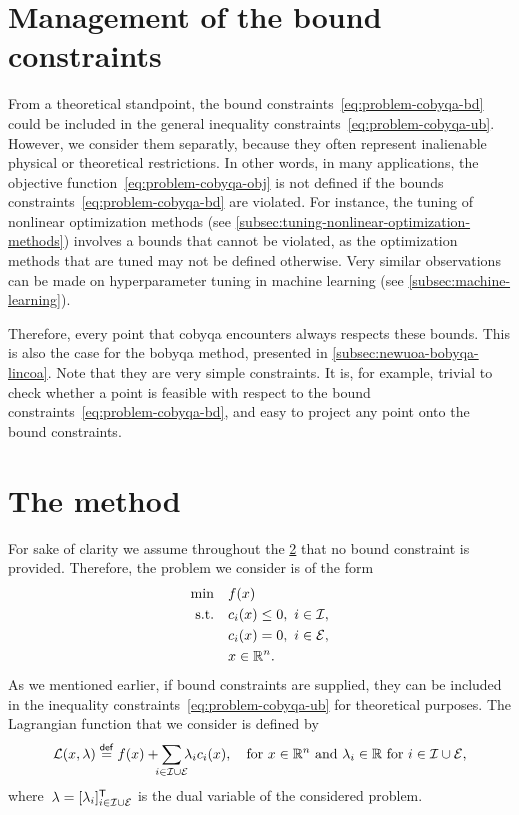 \section{Management of the bound constraints}

From a theoretical standpoint, the bound constraints~\cref{eq:problem-cobyqa-bd} could be included in the general inequality constraints~\cref{eq:problem-cobyqa-ub}.
However, we consider them separatly, because they often represent inalienable physical or theoretical restrictions.
In other words, in many applications, the objective function~\cref{eq:problem-cobyqa-obj} is not defined if the bounds constraints~\cref{eq:problem-cobyqa-bd} are violated.
For instance, the tuning of nonlinear optimization methods (see \cref{subsec:tuning-nonlinear-optimization-methods}) involves a bounds that cannot be violated, as the optimization methods that are tuned may not be defined otherwise.
Very similar observations can be made on hyperparameter tuning in machine learning (see \cref{subsec:machine-learning}).

Therefore, every point that \gls{cobyqa} encounters always respects these bounds.
This is also the case for the \gls{bobyqa} method, presented in \cref{subsec:newuoa-bobyqa-lincoa}.
Note that they are very simple constraints.
It is, for example, trivial to check whether a point is feasible with respect to the bound constraints~\cref{eq:problem-cobyqa-bd}, and easy to project any point onto the bound constraints.


\section{The  method}
\label{sec:sqp-method}

For sake of clarity we assume throughout the \cref{sec:sqp-method} that no bound constraint is provided.
Therefore, the problem we consider is of the form
\begin{subequations}
    \label{eq:problem-cobyqa-no-bounds}
    \begin{align}
        \min        & \quad f(x)\\
        \text{s.t.} & \quad c_{i}(x) \le 0, ~ i \in \mathcal{I},\\
                    & \quad c_{i}(x) = 0, ~ i \in \mathcal{E},\\
                    & \quad x \in \mathbb{R}^n. \nonumber
    \end{align}
\end{subequations}
As we mentioned earlier, if bound constraints are supplied, they can be included in the inequality constraints~\cref{eq:problem-cobyqa-ub} for theoretical purposes.
The Lagrangian function that we consider is defined by
\begin{equation*}
    \lag(x, \lambda) \eqdef \obj(x) + \sum_{\mathclap{i \in \iub \cup \ieq}} \lambda_i \con{i}(x), \quad \text{for~$x \in \R^n$ and~$\lambda_i \in \R$ for~$i \in \iub \cup \ieq$},
\end{equation*}
where~$\lambda = [\lambda_i]_{i \in \mathcal{I} \cup \mathcal{E}}^{\mathsf{T}}$ is the dual variable of the considered problem.


